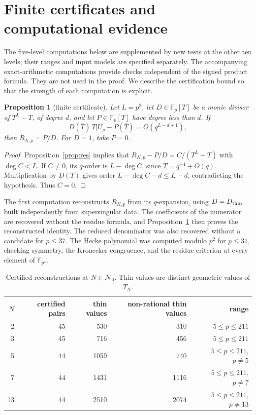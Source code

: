 \documentclass[11pt,a4paper]{article}
\numberwithin{equation}{section}
\newtheorem{proposition}[theorem]{Proposition}
\theoremstyle{definition}
\theoremstyle{remark}
\newcommand{\Fp}{\mathbb F_p}
\newcommand{\Fq}{\mathbb F_{p^2}}
\begin{document}
\section{Finite certificates and computational evidence}\label{sec:comp}
The five-level computations below are supplemented by new tests at the
other ten levels; their ranges and input models are specified separately.
The accompanying exact-arithmetic computations provide checks independent of the
signed product formula. They are not used in the proof. We describe the certification
bound so that the strength of each computation is explicit.

\begin{proposition}[finite certificate]\label{prop:certificate}
Let $L=p^2$, let $D\in\Fp[T]$ be a monic divisor of $T^L-T$, of degree $d$, and
let $P\in\Fp[T]$ have degree less than $d$. If
\[
D(\overline T)\,\overline{T|U_p}-P(\overline T)=O(q^{L-d+1}),
\]
then $R_{N,p}=P/D$. For $D=1$, take $P=0$.
\end{proposition}
\begin{proof}
Proposition~\ref{prop:res} implies that
$R_{N,p}-P/D=C/(T^L-T)$ with $\deg C<L$.
If $C\ne0$, its $q$-order is $L-\deg C$, since $T=q^{-1}+O(q)$.
Multiplication by $D(T)$ gives order $L-\deg C-d\le L-d$, contradicting the
hypothesis. Thus $C=0$.
\end{proof}

The first computation reconstructs $R_{N,p}$ from its $q$-expansion, using
$D=D_{\rm thin}$ built independently from supersingular data.
The coefficients of the numerator are recovered without the residue formula,
and Proposition~\ref{prop:certificate} then proves the reconstructed identity.
The reduced denominator was also recovered without a candidate for $p\le37$.
The Hecke polynomial was computed modulo $p^2$ for $p\le31$, checking symmetry,
the Kronecker congruence, and the residue criterion at every element of $\Fq$.

\begin{table}[ht]\centering
\begin{tabular}{rrrrr}\toprule
$N$ & certified pairs & thin values & non-rational thin values & range\\\midrule
2 & 45 & 530 & 310 & $5\le p\le211$\\
3 & 45 & 716 & 456 & $5\le p\le211$\\
5 & 44 & 1059 & 740 & $5\le p\le211$, $p\ne5$\\
7 & 44 & 1431 & 1116 & $5\le p\le211$, $p\ne7$\\
13 & 44 & 2510 & 2074 & $5\le p\le211$, $p\ne13$\\\bottomrule
\end{tabular}
\caption{Certified reconstructions at $N\in\mathcal N_0$.
Thin values are distinct geometric values of $T_N$.}
\label{tab:n0-levels}
\end{table}
\end{document}
